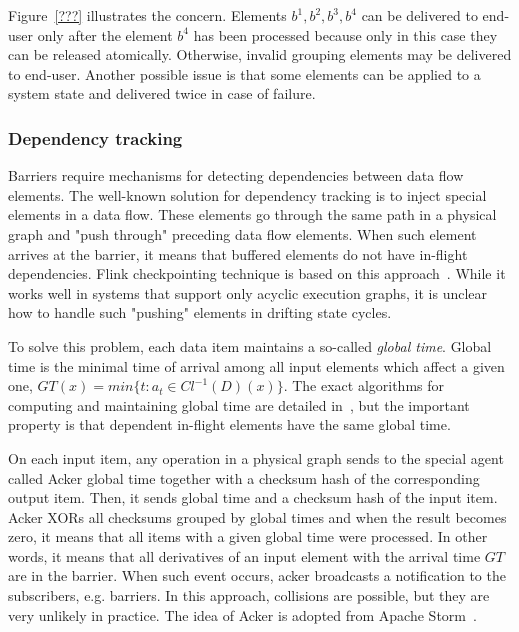 Figure~\ref{???} illustrates the concern. Elements $b^{1},b^{2},b^{3},b^{4}$ can be delivered to end-user only after the element $b^{4}$ has been processed because only in this case they can be released atomically. Otherwise, invalid grouping elements may be delivered to end-user. Another possible issue is that some elements can be applied to a system state and delivered twice in case of failure. 


\subsubsection{Dependency tracking}

Barriers require mechanisms for detecting dependencies between data flow elements. The well-known solution for dependency tracking is to inject special elements in a data flow. These elements go through the same path in a physical graph and "push through" preceding data flow elements. When such element arrives at the barrier, it means that buffered elements do not have in-flight dependencies. Flink checkpointing technique is based on this approach~\cite{Carbone:2017:SMA:3137765.3137777}. While it works well in systems that support only acyclic execution graphs, it is unclear how to handle such "pushing" elements in drifting state cycles. 

To solve this problem, each data item maintains a so-called {\em global time}. Global time is the minimal time of arrival among all input elements which affect a given one,  $GT(x)=min\{t:a_t\in Cl^{-1}(D)(x)\}$. The exact algorithms for computing and maintaining global time are detailed in~\cite{we2018adbis}, but the important property is that dependent in-flight elements have the same global time. 

On each input item, any operation in a physical graph sends to the special agent called Acker global time together with a checksum hash of the corresponding output item. Then, it sends global time and a checksum hash of the input item. Acker XORs all checksums grouped by global times and when the result becomes zero, it means that all items with a given global time were processed. In other words, it means that all derivatives of an input element with the arrival time $GT$ are in the barrier. When such event occurs, acker broadcasts a notification to the subscribers, e.g. barriers. In this approach, collisions are possible, but they are very unlikely in practice. The idea of Acker is adopted from Apache Storm~\cite{apache:storm}.

